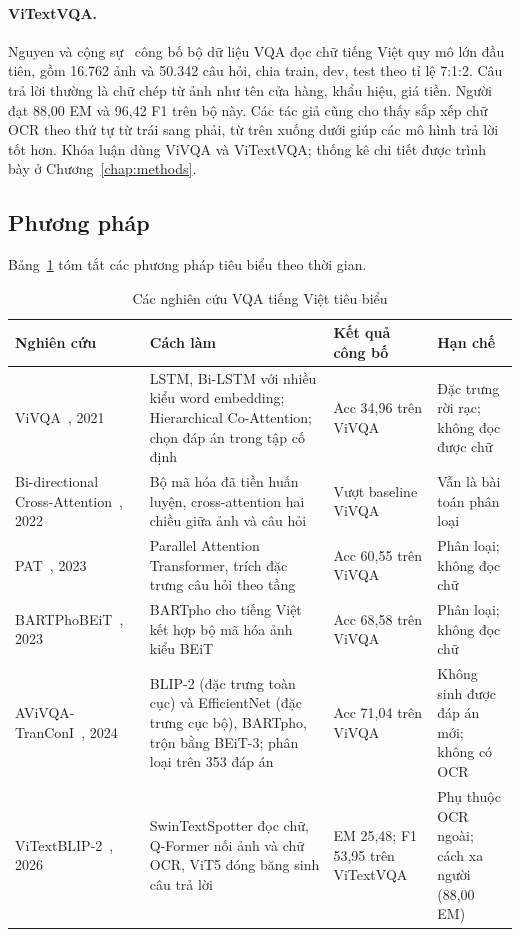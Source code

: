 \paragraph{ViTextVQA.} Nguyen và cộng sự~\cite{nguyen2024vitextvqa} công bố bộ dữ liệu VQA đọc chữ
tiếng Việt quy mô lớn đầu tiên, gồm 16.762 ảnh và 50.342 câu hỏi, chia train, dev,
test theo tỉ lệ 7:1:2. Câu trả lời thường là chữ chép từ ảnh như tên cửa hàng,
khẩu hiệu, giá tiền. Người đạt 88,00 EM và 96,42 F1 trên bộ này. Các tác giả cũng
cho thấy sắp xếp chữ OCR theo thứ tự từ trái sang phải, từ trên xuống dưới giúp
các mô hình trả lời tốt hơn. Khóa luận dùng ViVQA và ViTextVQA; thống kê chi tiết
được trình bày ở Chương~\ref{chap:methods}.

\subsection{Phương pháp}

Bảng~\ref{tab:rel-vivqa} tóm tắt các phương pháp tiêu biểu theo thời gian.

\begin{table}[htbp]
\caption{Các nghiên cứu VQA tiếng Việt tiêu biểu}
\label{tab:rel-vivqa}
\centering
\small
\begin{tabular}{p{}p{}p{}p{}}
\toprule
\textbf{Nghiên cứu} & \textbf{Cách làm} & \textbf{Kết quả công bố} & \textbf{Hạn chế} \\
\midrule
ViVQA~\cite{tran2021vivqa}, 2021 & LSTM, Bi-LSTM với nhiều kiểu word embedding; Hierarchical Co-Attention; chọn đáp án trong tập cố định & Acc 34,96 trên ViVQA & Đặc trưng rời rạc; không đọc được chữ \\
Bi-directional Cross-Attention~\cite{nguyentran2022bica}, 2022 & Bộ mã hóa đã tiền huấn luyện, cross-attention hai chiều giữa ảnh và câu hỏi & Vượt baseline ViVQA & Vẫn là bài toán phân loại \\
PAT~\cite{nguyen2023pat}, 2023 & Parallel Attention Transformer, trích đặc trưng câu hỏi theo tầng & Acc 60,55 trên ViVQA & Phân loại; không đọc chữ \\
BARTPhoBEiT~\cite{tran2023bartphobeit}, 2023 & BARTpho cho tiếng Việt kết hợp bộ mã hóa ảnh kiểu BEiT & Acc 68,58 trên ViVQA & Phân loại; không đọc chữ \\
AViVQA-TranConI~\cite{nguyen2024tranconi}, 2024 & BLIP-2 (đặc trưng toàn cục) và EfficientNet (đặc trưng cục bộ), BARTpho, trộn bằng BEiT-3; phân loại trên 353 đáp án & Acc 71,04 trên ViVQA & Không sinh được đáp án mới; không có OCR \\
ViTextBLIP-2~\cite{nguyen2024vitextvqa}, 2026 & SwinTextSpotter đọc chữ, Q-Former nối ảnh và chữ OCR, ViT5 đóng băng sinh câu trả lời & EM 25,48; F1 53,95 trên ViTextVQA & Phụ thuộc OCR ngoài; cách xa người (88,00 EM) \\
\bottomrule
\end{tabular}
\end{table}

